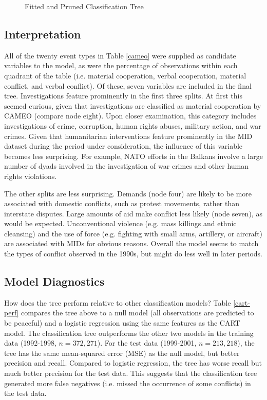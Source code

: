 \documentclass[12pt,letterpaper]{article} %
\begin{document}
\begin{figure}
  \begin{center}
    
    \caption{Fitted and Pruned Classification Tree}
    \label{tree}
  \end{center}
\end{figure}

\subsection{Interpretation}

All of the twenty event types in Table \ref{cameo} were supplied as candidate variables to the model, as were the percentage of observations within each quadrant of the table (i.e. material cooperation, verbal cooperation, material conflict, and verbal conflict). Of these, seven variables are included in the final tree. Investigations feature prominently in the first three splits. At first this seemed curious, given that investigations are classified as material cooperation by CAMEO (compare node eight). Upon closer examination, this category includes investigations of crime, corruption, human rights abuses, military action, and war crimes. Given that humanitarian interventions feature prominently in the MID dataset during the period under consideration, the influence of this variable becomes less surprising. For example, NATO efforts in the Balkans involve a large number of dyads involved in the investigation of war crimes and other human rights violations. 

The other splits are less surprising. Demands (node four) are likely to be more associated with domestic conflicts, such as protest movements, rather than interstate disputes. Large amounts of aid make conflict less likely (node seven), as would be expected. Unconventional violence (e.g. mass killings and ethnic cleansing) and the use of force (e.g. fighting with small arms, artillery, or aircraft) are associated with MIDs for obvious reasons. Overall the model seems to match the types of conflict observed in the 1990s, but might do less well in later periods. 

\subsection{Model Diagnostics}

How does the tree perform relative to other classification models? Table \ref{cart-perf} compares the tree above to a null model (all observations are predicted to be peaceful) and a logistic regression using the same features as the CART model. The classification tree outperforms the other two models in the training data (1992-1998, $n=372,271$). For the test data (1999-2001, $n=213,218$), the tree has the same mean-squared error (MSE) as the null model, but better precision and recall. Compared to logistic regression, the tree has worse recall but much better precision for the test data. This suggests that the classification tree generated more false negatives (i.e. missed the occurrence of some conflicts) in the test data.
\end{document}
